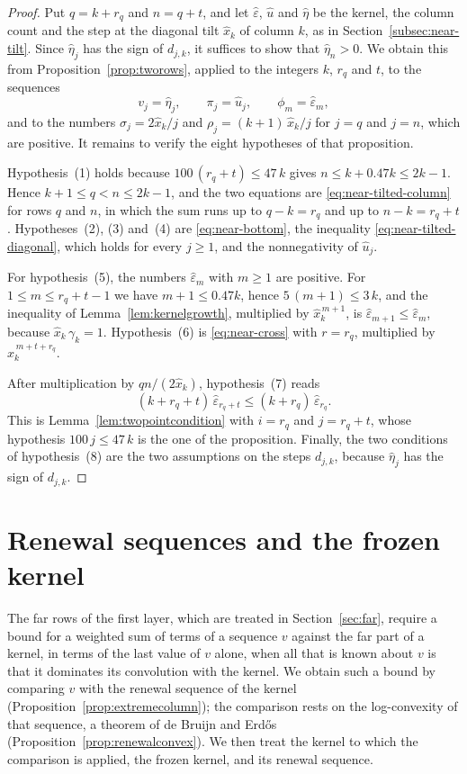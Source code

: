 \documentclass{amsart}
\theoremstyle{definition}
\theoremstyle{remark}
\numberwithin{equation}{section}
\begin{document}
\begin{proof}
Put $q=k+r_q$ and $n=q+t$, and let $\hat\varepsilon$, $\hat u$ and
$\hat\eta$ be the kernel, the column count and the step at the diagonal
tilt $\hat x_k$ of column $k$, as in Section~\ref{subsec:near-tilt}. Since
$\hat\eta_j$ has the sign of $d_{j,k}$, it suffices to show that
$\hat\eta_n>0$. We obtain
this from Proposition~\ref{prop:tworows}, applied to the integers $k$, $r_q$
and $t$, to the sequences
\[
v_j=\hat\eta_j,\qquad\pi_j=\hat u_j,\qquad\phi_m=\hat\varepsilon_m ,
\]
and to the numbers $\sigma_j=2\hat x_k/j$ and $\rho_j=(k+1)\,\hat x_k/j$
for $j=q$ and $j=n$, which are positive. It remains to verify the eight
hypotheses of that proposition.

Hypothesis~(1) holds because $100\,(r_q+t)\le47\,k$ gives
$n\le k+0.47k\le2k-1$. Hence $k+1\le q<n\le2k-1$, and the two equations are
\eqref{eq:near-tilted-column} for rows $q$ and $n$, in which the sum runs up
to $q-k=r_q$ and up to $n-k=r_q+t$. Hypotheses~(2), (3) and~(4) are
\eqref{eq:near-bottom}, the inequality \eqref{eq:near-tilted-diagonal},
which holds for every $j\ge1$, and the nonnegativity of $\hat u_j$.

For hypothesis~(5), the numbers $\hat\varepsilon_m$ with $m\ge1$ are
positive. For $1\le m\le r_q+t-1$ we have $m+1\le0.47k$, hence
$5\,(m+1)\le3\,k$, and the inequality of Lemma~\ref{lem:kernelgrowth},
multiplied by $\hat x_k^{\,m+1}$, is
$\hat\varepsilon_{m+1}\le\hat\varepsilon_m$, because $\hat x_k\,\gamma_k=1$.
Hypothesis~(6) is \eqref{eq:near-cross} with $r=r_q$, multiplied by
$\hat x_k^{\,m+t+r_q}$.

After multiplication by $qn/(2\hat x_k)$, hypothesis~(7) reads
\[
(k+r_q+t)\,\hat\varepsilon_{r_q+t}\le(k+r_q)\,\hat\varepsilon_{r_q} .
\]
This is Lemma~\ref{lem:twopointcondition} with $i=r_q$ and $j=r_q+t$, whose
hypothesis $100\,j\le47\,k$ is the one of the proposition. Finally, the two
conditions of hypothesis~(8) are the two assumptions on the steps $d_{j,k}$,
because $\hat\eta_j$ has the sign of $d_{j,k}$.
\end{proof}

\section{Renewal sequences and the frozen kernel}\label{sec:renewal}
The far rows of the first layer, which are treated in
Section~\ref{sec:far}, require a bound for a weighted sum of terms of a
sequence $v$ against the far part of a kernel, in terms of the last value of
$v$ alone, when all that is known about $v$ is that it dominates its
convolution with the kernel. We obtain such a bound by comparing $v$ with
the renewal sequence of the kernel (Proposition~\ref{prop:extremecolumn});
the comparison rests on the log-convexity of that sequence, a theorem of
de Bruijn and Erd\H{o}s (Proposition~\ref{prop:renewalconvex}). We then
treat the kernel to which the comparison is applied, the frozen kernel, and
its renewal sequence.
\end{document}
